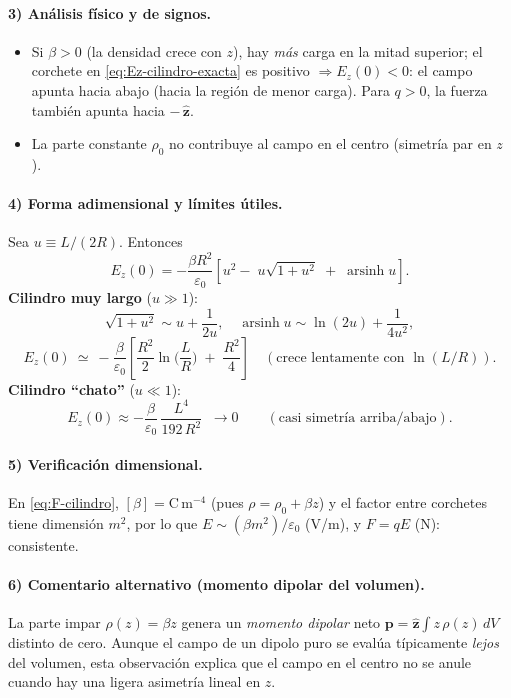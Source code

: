 \documentclass{article}
\begin{document}
\paragraph{3) Análisis físico y de signos.}
\begin{itemize}
\item Si $\beta>0$ (la densidad crece con $z$), hay \emph{más} carga en la mitad superior; el corchete en \eqref{eq:Ez-cilindro-exacta} es positivo $\Rightarrow E_z(0)<0$: el campo apunta hacia abajo (hacia la región de menor carga). Para $q>0$, la fuerza también apunta hacia $-\,\hat{\mathbf z}$.
\item La parte constante $\rho_0$ no contribuye al campo en el centro (simetría par en $z$).
\end{itemize}

\paragraph{4) Forma adimensional y límites útiles.}
Sea $u\equiv L/(2R)$. Entonces
\[
E_z(0)=-\frac{\beta R^2}{\varepsilon_0}\left[u^2-\;u\sqrt{1+u^2}\;+\;\operatorname{arsinh}u\right].
\]
\textbf{Cilindro muy largo} ($u\gg 1$):
\[
\sqrt{1+u^2}\sim u+\frac{1}{2u},\quad \operatorname{arsinh}u\sim \ln(2u)+\frac{1}{4u^2},
\]
\[
E_z(0)\ \simeq\ -\frac{\beta}{\varepsilon_0}\left[\frac{R^2}{2}\ln\!\Big(\frac{L}{R}\Big)\;+\;\frac{R^2}{4}\right]\quad(\text{crece lentamente con }\ln(L/R)).
\]
\textbf{Cilindro “chato”} ($u\ll 1$):
\[
E_z(0)\approx -\frac{\beta}{\varepsilon_0}\,\frac{L^4}{192\,R^2}\;\;\to 0
\qquad (\text{casi simetría arriba/abajo}).
\]

\paragraph{5) Verificación dimensional.}
En \eqref{eq:F-cilindro}, $[\beta]=\mathrm{C\,m^{-4}}$ (pues $\rho=\rho_0+\beta z$) y el factor entre corchetes tiene dimensión $m^2$, por lo que $E\sim (\beta m^2)/\varepsilon_0$ (V/m), y $F=qE$ (N): consistente.

\paragraph{6) Comentario alternativo (momento dipolar del volumen).}
La parte impar $\rho(z)=\beta z$ genera un \emph{momento dipolar} neto $\mathbf p=\hat{\mathbf z}\int z\,\rho(z)\,dV$ distinto de cero. Aunque el campo de un dipolo puro se evalúa típicamente \emph{lejos} del volumen, esta observación explica que el campo en el centro no se anule cuando hay una ligera asimetría lineal en $z$.
\end{document}
